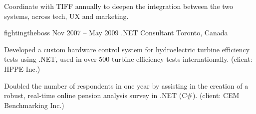 \documentclass[10pt]{article}
\begin{document}
{{\begin{newitemize}
		\item {Coordinate with TIFF annually to deepen the integration between the two systems, across tech, UX and marketing.}
		\end{newitemize}}
	\job
	{fightingtheboss}
	{Nov 2007 – May 2009}
	{.NET Consultant}
	{Toronto, Canada}
	{\begin{newitemize}
		\item {Developed a custom hardware control system for hydroelectric turbine efficiency tests using .NET, used in over 500 turbine efficiency tests internationally. (client: HPPE Inc.)}
		\item {Doubled the number of respondents in one year by assisting in the creation of a robust, real-time online pension analysis survey in .NET (C\#). (client: CEM Benchmarking Inc.)}
		\end{newitemize}}
}



\
\end{document}

